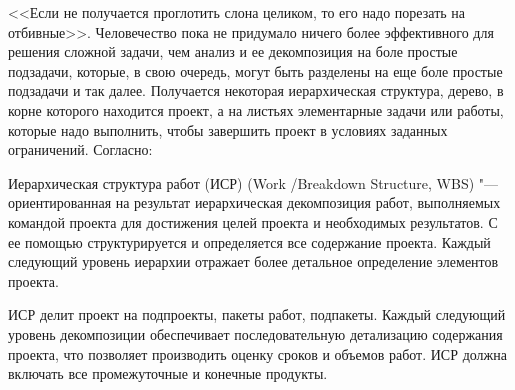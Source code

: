 \documentclass{../industrial-development}
\begin{document}
    <<Если не получается проглотить слона целиком, то его надо порезать на отбивные>>. Человечество пока не придумало ничего более эффективного для решения сложной задачи, чем анализ и ее декомпозиция на боле простые подзадачи, которые, в свою очередь, могут быть разделены на еще боле простые подзадачи и так далее. Получается некоторая иерархическая структура, дерево, в корне которого находится проект, а на листьях элементарные задачи или работы, которые надо выполнить, чтобы завершить проект в условиях заданных ограничений. Согласно:
    
    Иерархическая структура работ (ИСР) (Work /Breakdown Structure, WBS) "--- ориентированная на результат иерархическая декомпозиция работ, выполняемых командой проекта для достижения целей проекта и необходимых результатов. С ее помощью структурируется и определяется все содержание проекта. Каждый следующий уровень иерархии отражает более детальное определение элементов проекта.
    
    ИСР делит проект на подпроекты, пакеты работ, подпакеты. Каждый следующий уровень декомпозиции обеспечивает последовательную детализацию содержания проекта, что позволяет производить оценку сроков и объемов работ. ИСР должна включать все промежуточные и конечные продукты. 
\end{document}
